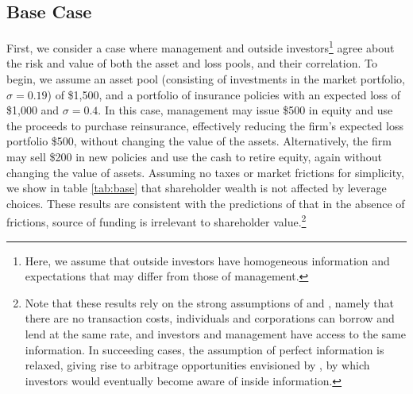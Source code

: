 \subsection{Base Case}

First, we consider a case where management and outside investors\footnote{Here, we assume that outside investors have homogeneous information and expectations that may differ from those of management.} agree about the risk and value of both the asset and loss pools, and their correlation.  To begin, we assume an asset pool (consisting of investments in the market portfolio, $\sigma=0.19$) of \$1,500, and a portfolio of insurance policies with an expected loss of \$1,000 and $\sigma=0.4$.  In this case, management may issue \$500 in equity and use the proceeds to purchase reinsurance, effectively reducing the firm's expected loss portfolio \$500, without changing the value of the assets.  Alternatively, the firm may sell \$200 in new policies and use the cash to retire equity, again without changing the value of assets. Assuming no taxes or market frictions for simplicity, we show in table \ref{tab:base} that shareholder wealth is not affected by leverage choices.  These results are consistent with the predictions of \citet{modigliani1958a} that in the absence of frictions, source of funding is irrelevant to shareholder value.\footnote{Note that these results rely on the strong assumptions of \citet{modigliani1958a} and \citet{modigliani1963a}, namely that there are no transaction costs,  individuals and corporations can borrow and lend at the same rate, and  investors and management have access to the same information.  In succeeding cases, the assumption of perfect information is relaxed, giving rise to arbitrage opportunities envisioned by \citet{miller1988a}, by which investors would eventually become aware of inside information.}

